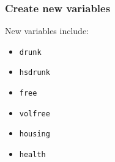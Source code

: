 \documentclass[]{article}
\providecommand{\tightlist}{%
  \setlength{\itemsep}{0pt}\setlength{\parskip}{0pt}}
\begin{document}
\hypertarget{create-new-variables}{%
\subsubsection{Create new variables}\label{create-new-variables}}

New variables include:

\begin{itemize}
\tightlist
\item
  \texttt{drunk}
\item
  \texttt{hsdrunk}
\item
  \texttt{free}
\item
  \texttt{volfree}
\item
  \texttt{housing}
\item
  \texttt{health}
\end{itemize}
\end{document}
